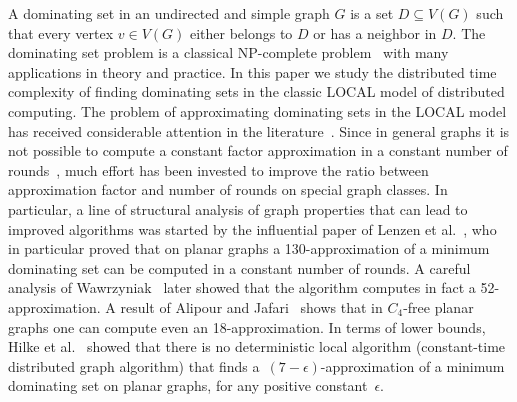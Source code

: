 \documentclass[a4paper,UKenglish,cleveref, autoref, thm-restate]{lipics-v2021}
\begin{document}
A dominating set in an undirected and simple graph $G$ is a set
$D\subseteq V(G)$ such that every vertex $v\in V(G)$ either belongs
to $D$ or has a neighbor in $D$. The dominating set problem is a
classical NP-complete problem~\cite{karp1972reducibility} with many
applications in theory and practice. In this paper we study
the distributed time complexity of finding
dominating sets in the classic LOCAL model of distributed computing.
%
The problem of approximating
dominating sets in the LOCAL model has received considerable
attention in the literature~\cite{akhoondian2018distributed,
akhoondian2016local,
alipour2020local,
amiri2016brief,
amiri2019distributed,
barenboim2018fast,
czygrinow2008fast,
czygrinow2018distributed,
DBLP:conf/stoc/GhaffariKM17,
hilke2014brief,
kublenz2020distributed,
KuhnMW16,
lenzen2013distributed,
lenzen2008leveraging,
lenzen2010minimum,
DBLP:conf/stoc/RozhonG20,
wawrzyniak2013brief,
wawrzyniak2014strengthened}. Since in general graphs
it is not possible to compute a
constant factor approximation in a constant number of rounds~\cite{KuhnMW16},
much effort has been invested to improve the ratio between approximation
factor and number of rounds on special graph classes. In particular, a
line of structural analysis of graph properties that can lead to improved
algorithms was started by the influential paper of Lenzen et al.~\cite{lenzen2013distributed}, who in particular proved that on planar graphs
a 130-approximation
of a minimum dominating set can be computed in a constant number of
rounds. A careful analysis of Wawrzyniak~\cite{wawrzyniak2014strengthened}
later showed that the algorithm computes in fact a 52-approximation. A
result of Alipour and Jafari~\cite{alipour2020local} shows that in $C_4$-free
planar graphs one can compute even an 18-approximation. In terms of lower bounds, Hilke et al.~\cite{hilke2014brief} showed that there is no
deterministic local algorithm (constant-time distributed graph algorithm) that
finds a~$(7-\epsilon)$-approximation of a minimum dominating set on
planar graphs, for any positive constant~$\epsilon$.
\end{document}
